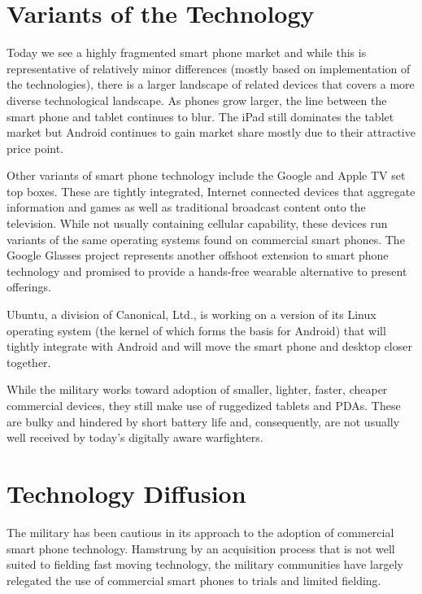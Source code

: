 \documentclass[letterpaper,12pt]{article}
\begin{document}
\section*{Variants of the Technology}
Today we see a highly fragmented smart phone market and while this is representative of relatively minor differences (mostly based on implementation of the technologies), there is a larger landscape of related devices that covers a more diverse technological landscape.  As phones grow larger, the line between the smart phone and tablet continues to blur.  The iPad still dominates the tablet market but Android continues to gain market share mostly due to their attractive price point.

Other variants of smart phone technology include the Google and Apple TV set top boxes.  These are tightly integrated, Internet connected devices that aggregate information and games as well as traditional broadcast content onto the television.  While not usually containing cellular capability, these devices run variants of the same operating systems found on commercial smart phones.  The Google Glasses project represents another offshoot extension to smart phone technology and promised to provide a hands-free wearable alternative to present offerings.

Ubuntu, a division of Canonical, Ltd., is working on a version of its Linux operating system (the kernel of which forms the basis for Android) that will tightly integrate with Android and will move the smart phone and desktop closer together.

While the military works toward adoption of smaller, lighter, faster, cheaper commercial devices, they still make use of ruggedized tablets and PDAs.  These are bulky and hindered by short battery life and, consequently, are not usually well received by today's digitally aware warfighters.

\section*{Technology Diffusion}
The military has been cautious in its approach to the adoption of commercial smart phone technology.  Hamstrung by an acquisition process that is not well suited to fielding fast moving technology, the military communities have largely relegated the use of commercial smart phones to trials and limited fielding.
\end{document}
